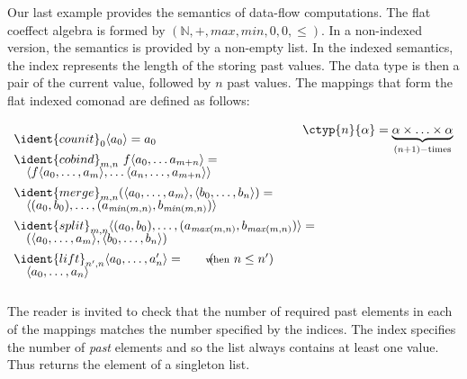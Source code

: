 \begin{example}
Our last example provides the semantics of data-flow computations. The flat coeffect algebra 
is formed by $(\mathbb{N}, +, \mathit{max}, \mathit{min}, 0, 0, \leq)$. In a 
non-indexed version, the semantics is provided by a non-empty list. In the indexed semantics,
the index represents the length of the storing past values. The data type is then a pair of 
the current value, followed by $n$ past values. The mappings that form the flat indexed comonad 
are defined as follows:

\begin{equation*}
\begin{array}{l}
\ident{counit}_{0}\langle a_0 \rangle = a_0
\\[0.45em]
\ident{cobind}_{m, n}~f \langle a_0, \ldots a_{m+n} \rangle = \\[-0.25em]
\quad \langle f \langle a_0, \ldots, a_m \rangle, \ldots \langle a_{n}, \ldots, a_{m+n} \rangle \rangle
\\[0.45em]
\ident{merge}_{m, n} (\langle a_0, \ldots, a_m \rangle, \langle b_0, \ldots, b_n\rangle) = \\[-0.25em]
\quad \langle (a_0, b_0), \ldots, (a_{\mathit{min}(m,n)}, b_{\mathit{min}(m,n)}) \rangle
\\[0.45em]
\ident{split}_{m, n} \langle (a_0, b_0), \ldots, (a_{\mathit{max}(m,n)}, b_{\mathit{max}(m,n)}) \rangle = \\[-0.25em]
\quad (\langle a_0, \ldots, a_m \rangle, \langle b_0, \ldots, b_n\rangle)
\\[0.45em]
\ident{lift}_{n', n} \langle a_0, \ldots, a_n' \rangle = \qquad(\hspace{-0.95em}\textnormal{\footnotesize when}~n\leq n') \\[-0.25em]
\quad \langle a_0, \ldots, a_n \rangle
\end{array}
\begin{array}{l}
\hspace{-2em}\ctyp{n}{\alpha} = \underbrace{\alpha \times \ldots \times \alpha}_{(n+1)-\textnormal{times}}\\[11em]
~\\
\end{array}
\end{equation*}
\end{example}

\noindent
The reader is invited to check that the number of required past elements in each of the mappings
matches the number specified by the indices. The index specifies the number of \emph{past} elements
and so the list always contains at least one value. Thus  returns the element of a
singleton list.

